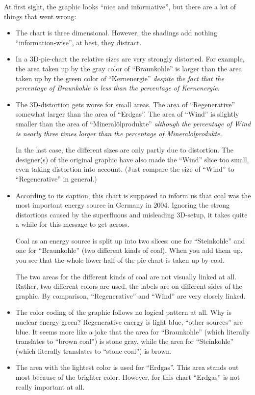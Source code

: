 At first sight, the graphic looks ``nice and informative'', but there are a lot
of things that went wrong:
%
\begin{itemize}
    \item The chart is three dimensional. However, the shadings add nothing
        ``information-wise'', at best, they distract.
    \item In a 3D-pie-chart the relative sizes are very strongly distorted.
        For example, the area taken up by the gray color of ``Braunkohle'' is
        larger than the area taken up by the green color of ``Kernenergie''
        \emph{despite the fact that the percentage of Braunkohle is less than
        the percentage of Kernenergie}.
    \item The 3D-distortion gets worse for small areas. The area of
        ``Regenerative'' somewhat larger  than the area of ``Erdgas''. The
        area of ``Wind'' is slightly smaller than the area of
        ``Mineral\"olprodukte'' \emph{although the percentage of Wind is
        nearly three times larger than the percentage of
        Mineral\"olprodukte.}

        In the last case, the different sizes are only partly due to
        distortion. The designer(s) of the original graphic have also made
        the ``Wind'' slice too small, even taking distortion into
        account. (Just compare the size of ``Wind'' to ``Regenerative'' in
        general.)
    \item According to its caption, this chart is supposed to inform us that
        coal was the most important energy source in Germany in 2004.
        Ignoring the strong distortions caused by the superfluous and
        misleading 3D-setup, it takes quite a while for this message to get
        across.

        Coal as an energy source is split up into two slices: one for
        ``Steinkohle'' and one for ``Braunkohle'' (two different kinds of
        coal). When you add them up, you see that the whole lower half of
        the pie chart is taken up by coal.

        The two areas for the different kinds of coal are not visually
        linked at all. Rather, two different colors are used, the labels are
        on different sides of the graphic. By comparison, ``Regenerative''
        and ``Wind'' are very closely linked.
    \item The color coding of the graphic follows no logical pattern at all.
        Why is nuclear energy green? Regenerative energy is light blue,
        ``other sources'' are blue. It seems more like a joke that the area
        for ``Braunkohle'' (which literally translates to ``brown coal'') is
        stone gray, while the area for ``Steinkohle'' (which literally
        translates to ``stone coal'') is brown.
    \item The area with the lightest color is used for ``Erdgas''. This area
        stands out most because of the brighter color. However, for this
        chart ``Erdgas'' is not really important at all.
\end{itemize}
